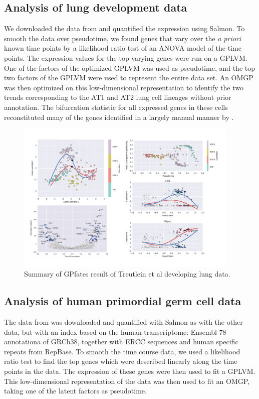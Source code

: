 \subsection{Analysis of lung development data}

We downloaded the data from \cite{Treutlein2014-rz} and quantified the expression using Salmon. To smooth the data over pseudotime, we found genes that vary over the \textit{a priori} known time points by a likelihood ratio test of an ANOVA model of the time points. The expression values for the top varying genes were run on a GPLVM. One of the factors of the optimized GPLVM was used as pseudotime, and the top two factors of the GPLVM were used to represent the entire data set. An OMGP was then optimized on this low-dimensional representation to identify the two trends corresponding to the AT1 and AT2 lung cell lineages without prior annotation. The bifurcation statistic for all expressed genes in these cells reconstituted many of the genes identified in a largely manual manner by \cite{Treutlein2014-rz}.

\begin{figure}
    \centering
    \includegraphics[width=0.95\textwidth]{"fig-treutlein"}
    \caption{Summary of GPfates result of Treutlein et al developing lung data.}
    \label{fig:treutlein}
\end{figure}

\subsection{Analysis of human primordial germ cell data}

The data from \cite{Guo2015-ao} was downloaded and quantified with Salmon as with the other data, but with an index based on the human transcriptome: Ensembl 78 annotationa of GRCh38, together with ERCC sequences and human specific repeats from RepBase. To smooth the time course data, we used a likelihood ratio test to find the top genes which were described linearly along the time points in the data. The expression of these genes were then used to fit a GPLVM. This low-dimensional representation of the data was then used to fit an OMGP, taking one of the latent factors as pseudotime.

